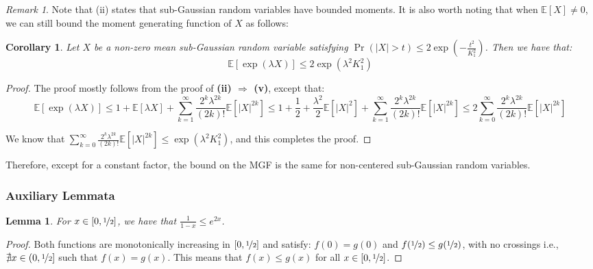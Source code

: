 \documentclass{article}
\newtheorem{corollary}{Corollary}[subsection]
\newtheorem{lemma}{Lemma}[subsection]
\theoremstyle{remark}
\newtheorem*{remark}{Remark}
\newcommand{\Exp}{\mathbb{E}}
\begin{document}
\begin{remark}
Note that (ii) states that sub-Gaussian random variables have bounded moments. It is also worth noting that when \(\Exp[X] \neq 0\), we can still bound the moment generating function of \(X\) as follows:
\begin{corollary}
Let \(X\) be a non-zero mean sub-Gaussian random variable satisfying \(\Pr(|X| > t) \leq 2\exp\left(-\frac{t^{2}}{K_{1}^{2}}\right)\). Then we have that:
\begin{equation*}
\Exp[\exp(\lambda X)] \leq 2\exp(\lambda^{2}K_{1}^{2})
\end{equation*}
\end{corollary}

\begin{proof}
The proof mostly follows from the proof of \textbf{(ii) \(\Rightarrow\) (v)}, except that:
\begin{equation*}
\Exp[\exp(\lambda X)] \leq 1 + \Exp[\lambda X] + \sum_{k=1}^{\infty} \frac{2^{k}\lambda^{2k}}{(2k)!}\Exp[|X|^{2k}] \leq 1 + \frac{1}{2} + \frac{\lambda^{2}}{2}\Exp[|X|^{2}] + \sum_{k=1}^{\infty} \frac{2^{k}\lambda^{2k}}{(2k)!}\Exp[|X|^{2k}] \leq 2\sum_{k=0}^{\infty} \frac{2^{k}\lambda^{2k}}{(2k)!}\Exp[|X|^{2k}]
\end{equation*}

We know that \(\sum\limits_{k=0}^{\infty} \frac{2^{k}\lambda^{2k}}{(2k)!}\Exp[|X|^{2k}] \leq \exp(\lambda^{2}K_{1}^{2})\), and this completes the proof.
\end{proof}
Therefore, except for a constant factor, the bound on the MGF is the same for non-centered sub-Gaussian random variables.
\end{remark}

\subsubsection{Auxiliary Lemmata}
\begin{lemma}
\label{lem:geometric-series-exponential}
For \(x \in [0, \nicefrac{1}{2}]\), we have that \(\frac{1}{1 - x} \leq e^{2x}\).
\end{lemma}

\begin{proof}
Both functions are monotonically increasing in \([0, \nicefrac{1}{2}]\) and satisfy: \(f(0) = g(0)\) and \(f(\nicefrac{1}{2}) \leq g(\nicefrac{1}{2})\), with no crossings i.e., \(\nexists x \in (0, \nicefrac{1}{2}]\) such that \(f(x) = g(x)\). This means that \(f(x) \leq g(x)\) for all \(x \in [0, \nicefrac{1}{2}]\).
\end{proof}
\end{document}
